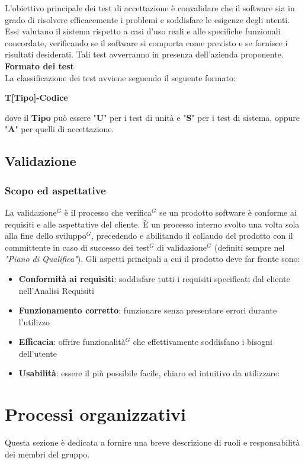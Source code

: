 \documentclass[a4paper,10pt]{article}
\begin{document}
L'obiettivo principale dei test di accettazione è convalidare che il software sia in grado di risolvere efficacemente i problemi e soddisfare le esigenze degli utenti.\\
Essi valutano il sistema rispetto a casi d'uso reali e alle specifiche funzionali concordate, verificando se il software si comporta come previsto e se fornisce i risultati desiderati. Tali test avverranno in presenza dell'azienda proponente.\\
\textbf{Formato dei test}\\
La classificazione dei test avviene seguendo il seguente formato:
\begin{center}
  \textbf{T[Tipo]-Codice}
\end{center}
dove il \textbf{Tipo} può essere "\textbf{U}" per i test di unità e "\textbf{S}" per i test di sistema, oppure "\textbf{A}" per quelli di accettazione.

\subsection{Validazione}
\subsubsection{Scopo ed aspettative}
La validazione$^G$ è il processo che verifica$^G$ se un prodotto software è conforme ai requisiti e alle aspettative del cliente.
È un processo interno svolto una volta sola alla fine dello sviluppo$^G$, precedendo e abilitando il collaudo del prodotto con il committente
in caso di successo dei test$^G$ di validazione$^G$ (definiti sempre nel \textit{"Piano di Qualifica"}).
Gli aspetti principali a cui il prodotto deve far fronte sono:
\begin{itemize}
  \item \textbf{Conformità ai requisiti}: soddisfare tutti i requisiti specificati dal cliente nell'Analisi Requisiti
  \item \textbf{Funzionamento corretto}: funzionare senza presentare errori durante l'utilizzo 
  \item \textbf{Efficacia}: offrire funzionalità$^G$ che effettivamente soddisfano i bisogni dell'utente
  \item \textbf{Usabilità}: essere il più possibile facile, chiaro ed intuitivo da utilizzare:
\end{itemize}

\section{Processi organizzativi}
Questa sezione è dedicata a fornire una breve descrizione di ruoli e responsabilità dei membri del gruppo.
\end{document}

